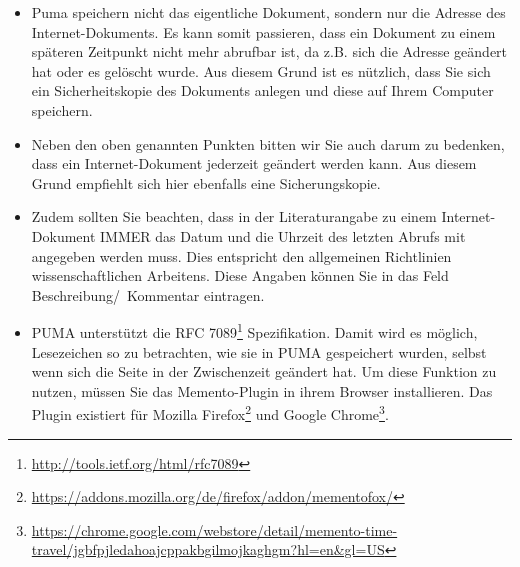 \begin{itemize}
    \item Puma speichern nicht das eigentliche Dokument, sondern nur die Adresse des Internet-Dokuments. Es kann somit passieren, dass ein Dokument zu einem späteren Zeitpunkt nicht mehr abrufbar ist, da z.B. sich die Adresse geändert hat oder es gelöscht wurde.  Aus diesem Grund ist es nützlich, dass Sie sich ein Sicherheitskopie des Dokuments anlegen und diese auf Ihrem Computer speichern.
    \item Neben den oben genannten Punkten bitten wir Sie auch darum zu bedenken, dass ein Internet-Dokument jederzeit geändert werden kann. Aus diesem Grund empfiehlt sich hier ebenfalls eine Sicherungskopie. 
    \item Zudem sollten Sie beachten, dass in der Literaturangabe zu einem Internet-Dokument IMMER das Datum und die Uhrzeit des letzten Abrufs mit angegeben werden muss. Dies entspricht den allgemeinen Richtlinien wissenschaftlichen Arbeitens. Diese Angaben können Sie in das Feld Beschreibung/~Kommentar eintragen.
    \item PUMA unterstützt die RFC 7089\footnote{\url{http://tools.ietf.org/html/rfc7089}} Spezifikation. Damit wird es möglich, Lesezeichen so zu betrachten, wie sie in PUMA gespeichert wurden, selbst wenn sich die Seite in der Zwischenzeit geändert hat. Um diese Funktion zu nutzen, müssen Sie das Memento-Plugin in ihrem Browser installieren. Das Plugin existiert für Mozilla Firefox\footnote{\url{https://addons.mozilla.org/de/firefox/addon/mementofox/}} und Google Chrome\footnote{\url{https://chrome.google.com/webstore/detail/memento-time-travel/jgbfpjledahoajcppakbgilmojkaghgm?hl=en&gl=US}}. 
\end{itemize}
